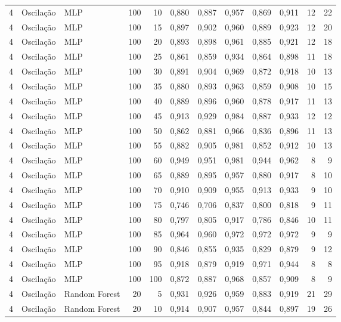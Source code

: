 \begin{longtable}{@{}rllrrrrrrrrr@{}}
4 & Oscilação & MLP & 100 & 10 & 0,880 & 0,887 & 0,957 & 0,869 & 0,911 & 12 & 22 \\
4 & Oscilação & MLP & 100 & 15 & 0,897 & 0,902 & 0,960 & 0,889 & 0,923 & 12 & 20 \\
4 & Oscilação & MLP & 100 & 20 & 0,893 & 0,898 & 0,961 & 0,885 & 0,921 & 12 & 18 \\
4 & Oscilação & MLP & 100 & 25 & 0,861 & 0,859 & 0,934 & 0,864 & 0,898 & 11 & 18 \\
4 & Oscilação & MLP & 100 & 30 & 0,891 & 0,904 & 0,969 & 0,872 & 0,918 & 10 & 13 \\
4 & Oscilação & MLP & 100 & 35 & 0,880 & 0,893 & 0,963 & 0,859 & 0,908 & 10 & 15 \\
4 & Oscilação & MLP & 100 & 40 & 0,889 & 0,896 & 0,960 & 0,878 & 0,917 & 11 & 13 \\
4 & Oscilação & MLP & 100 & 45 & 0,913 & 0,929 & 0,984 & 0,887 & 0,933 & 12 & 12 \\
4 & Oscilação & MLP & 100 & 50 & 0,862 & 0,881 & 0,966 & 0,836 & 0,896 & 11 & 13 \\
4 & Oscilação & MLP & 100 & 55 & 0,882 & 0,905 & 0,981 & 0,852 & 0,912 & 10 & 13 \\
4 & Oscilação & MLP & 100 & 60 & 0,949 & 0,951 & 0,981 & 0,944 & 0,962 & 8 & 9 \\
4 & Oscilação & MLP & 100 & 65 & 0,889 & 0,895 & 0,957 & 0,880 & 0,917 & 8 & 10 \\
4 & Oscilação & MLP & 100 & 70 & 0,910 & 0,909 & 0,955 & 0,913 & 0,933 & 9 & 10 \\
4 & Oscilação & MLP & 100 & 75 & 0,746 & 0,706 & 0,837 & 0,800 & 0,818 & 9 & 11 \\
4 & Oscilação & MLP & 100 & 80 & 0,797 & 0,805 & 0,917 & 0,786 & 0,846 & 10 & 11 \\
4 & Oscilação & MLP & 100 & 85 & 0,964 & 0,960 & 0,972 & 0,972 & 0,972 & 9 & 9 \\
4 & Oscilação & MLP & 100 & 90 & 0,846 & 0,855 & 0,935 & 0,829 & 0,879 & 9 & 12 \\
4 & Oscilação & MLP & 100 & 95 & 0,918 & 0,879 & 0,919 & 0,971 & 0,944 & 8 & 8 \\
4 & Oscilação & MLP & 100 & 100 & 0,872 & 0,887 & 0,968 & 0,857 & 0,909 & 8 & 9 \\
4 & Oscilação & Random Forest & 20 & 5 & 0,931 & 0,926 & 0,959 & 0,883 & 0,919 & 21 & 29 \\
4 & Oscilação & Random Forest & 20 & 10 & 0,914 & 0,907 & 0,957 & 0,844 & 0,897 & 19 & 26 \\

\end{longtable}
